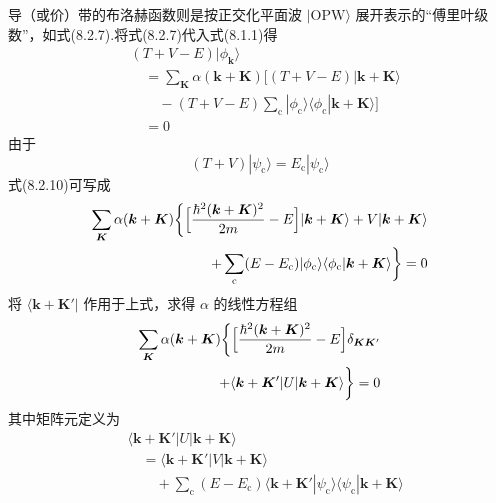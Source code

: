 导（或价）带的布洛赫函数则是按正交化平面波 $|\mathrm{OPW}\rangle$ 展开表示的“傅里叶级数”，如式(8.2.7).将式(8.2.7)代入式(8.1.1)得
\begin{equation}
\begin{aligned}
  &(T+V-E)|\phi_{\boldsymbol{k}}\rangle\\
  &\quad=\sum_{\boldsymbol{K}}\alpha(\boldsymbol{k}+\boldsymbol{K})\bigl[(T+V-E)|\boldsymbol{k}+\boldsymbol{K}\rangle\\
  &\qquad-(T+V-E)\sum_{\mathrm{c}}|\phi_{\mathrm{c}}\rangle\langle\phi_{\mathrm{c}}|\boldsymbol{k}+\boldsymbol{K}\rangle\bigr]\\
  &\quad=0
\end{aligned}
\end{equation}
由于
\begin{equation}
  (T+V)|\psi_{\mathrm{c}}\rangle=E_{\mathrm{c}}|\psi_{\mathrm{c}}\rangle
\end{equation}
式(8.2.10)可写成
\begin{equation}
\begin{aligned}
  \sum_{\boldsymbol{K}}\alpha(\boldsymbol{k}+\boldsymbol{K})\biggl\{\Bigl[\frac{\hbar^{2}(\boldsymbol{k}+\boldsymbol{K})^{2}}{2m}-E\Bigr]|\boldsymbol{k}+\boldsymbol{K}\rangle+V|\boldsymbol{k}+\boldsymbol{K}\rangle\\
  +\sum_{\mathrm{c}}(E-E_{\mathrm{c}})|\phi_{\mathrm{c}}\rangle\langle\phi_{\mathrm{c}}|\boldsymbol{k}+\boldsymbol{K}\rangle\biggr\}=0
\end{aligned}
\end{equation}
将 $\langle\boldsymbol{k}+\boldsymbol{K}'|$ 作用于上式，求得 $\alpha$ 的线性方程组
\begin{equation}
\begin{aligned}
  \sum_{\boldsymbol{K}}\alpha(\boldsymbol{k}+\boldsymbol{K})\biggl\{\Bigl[\frac{\hbar^{2}(\boldsymbol{k}+\boldsymbol{K})^{2}}{2m}-E\Bigr]\delta_{\boldsymbol{K}\boldsymbol{K}'}\\
  +\langle\boldsymbol{k}+\boldsymbol{K}'|U|\boldsymbol{k}+\boldsymbol{K}\rangle\biggr\}=0
\end{aligned}
\end{equation}
其中矩阵元定义为
\begin{equation}
\begin{aligned}
  &\langle\boldsymbol{k}+\boldsymbol{K}'|U|\boldsymbol{k}+\boldsymbol{K}\rangle\\
  &\quad=\langle\boldsymbol{k}+\boldsymbol{K}'|V|\boldsymbol{k}+\boldsymbol{K}\rangle\\
  &\qquad+\sum_{\mathrm{c}}(E-E_{\mathrm{c}})\langle\boldsymbol{k}+\boldsymbol{K}'|\psi_{\mathrm{c}}\rangle\langle\psi_{\mathrm{c}}|\boldsymbol{k}+\boldsymbol{K}\rangle
\end{aligned}
\end{equation}
